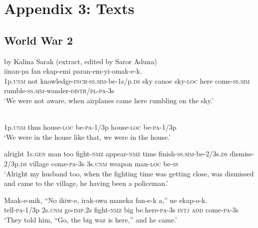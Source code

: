 
\chapter{Appendix 3: Texts}

\section{World War 2}
  by Kalina Sarak  (extract, edited by Saror Aduna) \\
\ea\label{ex:a:x1}
  {iinan-pa  fan  eka}{p-emi  paran-em-yi-omak-e-k.} \\
1p.\textsc{unm}  not  knowledge-\textsc{inch}-\textsc{ss}.\textsc{sim}-be-1s/p.\textsc{ds}  sky  canoe sky-\textsc{loc}  here  come-\textsc{ss}.\textsc{sim}  rumble-\textsc{ss}.\textsc{sim}-wander-\textsc{distr}/\textsc{pl}-\textsc{pa}-3s \\
\glt ‘We were not aware, when airplanes came here rumbling on the sky.’
\z


\ea\label{ex:a:x2}
 \\
1p.\textsc{unm}  thus  house-\textsc{loc}  be-\textsc{pa}-1/3p  house-\textsc{loc}  be-\textsc{pa}-1/3p \\
\glt ‘We were in the house like that, we were in the house.’
\z


\ea\label{ex:a:x3}
alright  1s.\textsc{gen}  man  too  fight-\textsc{nmz}  appear-\textsc{nmz}  time finish-\textsc{ss}.\textsc{sim}-be-2/3s.\textsc{ds}  dismiss-2/3p.\textsc{ds}  village  come-\textsc{pa}-3s 3s.\textsc{unm}  weapon  man-\textsc{loc}  be-\textsc{ss} \\
\glt ‘Alright my husband too, when the fighting time was getting close, was dismissed and came to the village, he having been a policeman.’ \\
\z


\ea\label{ex:a:x4}
\gll  Maak-e-mik,  “No  ikiw-e,  irak-owa  maneka  fan-e-k a,”  ne  ekap-o-k. \\
tell-\textsc{pa}-1/3p  2s.\textsc{unm}  go-\textsc{imp}.2s  fight-\textsc{nmz}  big  be.here-\textsc{pa}-3s \textsc{intj}  \textsc{add}  come-\textsc{pa}-3s \\
\glt ‘They told him, “Go, the big war is here,” and he came.’ \\
\z


